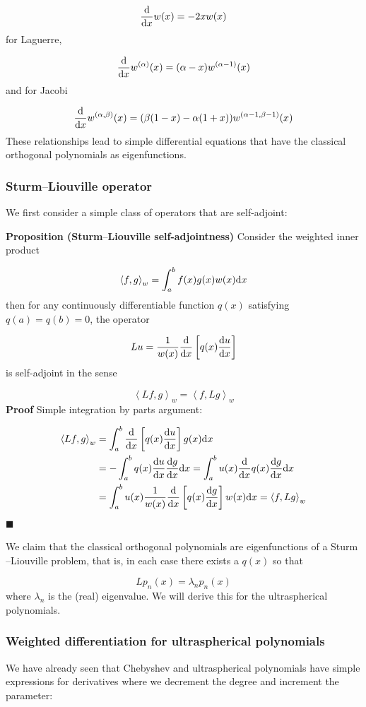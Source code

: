 \documentclass[12pt,a4paper]{article}
\def\D{ {\rm d} }
\def\addtab#1={#1\;&=}
\def\ccr{\\\addtab}
\def\ip<#1>{\left\langle{#1}\right\rangle}
\def\dx{\D x}
\def\endash{–}
\def\addtab#1={#1\;&=}
\def\ccr{\\\addtab}
\begin{document}
\[
{\D \over \dx} w(x) = -2x w(x)
\]
for Laguerre,

\[
{\D \over \dx} w^{(\alpha)}(x) = (\alpha  - x) w^{(\alpha-1)}(x)
\]
and for Jacobi

\[
{\D \over \dx} w^{(\alpha,\beta)}(x) = (\beta(1-x) - \alpha(1+x)) w^{(\alpha-1,\beta-1)}(x)
\]
These relationships  lead to simple differential equations that have the classical orthogonal polynomials as eigenfunctions.

\subsubsection{Sturm\ensuremath{\endash}Liouville operator}
We first consider a simple class of operators that are self-adjoint:

\textbf{Proposition (Sturm\ensuremath{\endash}Liouville self-adjointness)} Consider the weighted inner product

\[
\ip<f,g>_w = \int_a^b f(x) g(x) w(x) \dx
\]
then for any continuously differentiable function $q(x)$ satisfying $q(a) = q(b) = 0$, the operator

\[
Lu = {1 \over w(x)} {\D \over \dx}\left[ q(x) {\D u\over \dx} \right]
\]
is self-adjoint in the sense 

\[
\ip<L f,g>_w = \ip<f, Lg>_w
\]
\textbf{Proof} Simple integration by parts argument:


\begin{align*}
\ip<L f,g>_w &= \int_a^b {\D \over \dx}\left[ q(x) {\D u\over \dx}\right]  g(x)\dx \ccr
=  -\int_a^b q(x) {\D u\over \dx}    {\D g\over \dx} \dx =  \int_a^b   u(x)  {\D \over \dx}  q(x) {\D g\over \dx} \dx \ccr
= 
 \int_a^b   u(x)  {1 \over w(x)} {\D \over \dx}\left[q(x) {\D g\over \dx}\right] w(x) \dx = \ip<f, Lg>_w
 \end{align*}
\ensuremath{\blacksquare}

We claim that the classical orthogonal polynomials are eigenfunctions of a Sturm\ensuremath{\endash}Liouville problem, that is, in each case there exists a $q(x)$ so that 

\[
L p_n(x) = \lambda_n p_n(x)
\]
where $\lambda_n$ is the (real) eigenvalue. We will derive this for the ultraspherical polynomials.

\subsubsection{Weighted differentiation for ultraspherical polynomials}
We have already seen that Chebyshev and ultraspherical polynomials have simple expressions for derivatives where we decrement the degree and increment the parameter:
\end{document}
